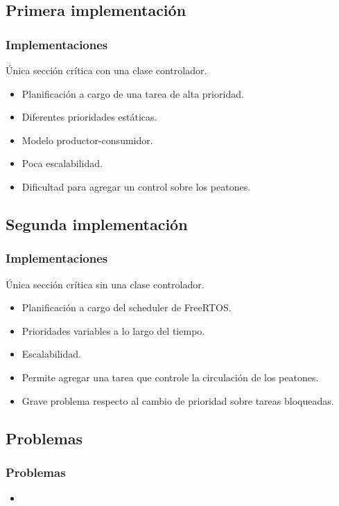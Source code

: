 \subsection{Primera implementación}

\begin{frame}
\frametitle{Implementaciones}
\begin{block}{Única sección crítica con una clase controlador.}
	\begin{itemize}
		\item Planificación a cargo de una tarea de alta prioridad.
		\item Diferentes prioridades estáticas.
		\item Modelo productor-consumidor.
		\item Poca escalabilidad.
		\item Dificultad para agregar un control sobre los peatones.
	\end{itemize}
\end{block}
\end{frame}

\subsection{Segunda implementación}
\begin{frame}
\frametitle{Implementaciones}
\begin{block}{Única sección crítica sin una clase controlador.}
	\begin{itemize}
		\item Planificación a cargo del scheduler de FreeRTOS.
		\item Prioridades variables a lo largo del tiempo.
		\item Escalabilidad.
		\item Permite agregar una tarea que controle la circulación de los peatones.
		\item Grave problema respecto al cambio de prioridad sobre tareas bloqueadas.
	\end{itemize}
\end{block}
\end{frame}

\subsection{Problemas}
\begin{frame}
\frametitle{Problemas}
\begin{block}{}
	\begin{itemize}
		\item
	\end{itemize}
\end{block}
\end{frame}

